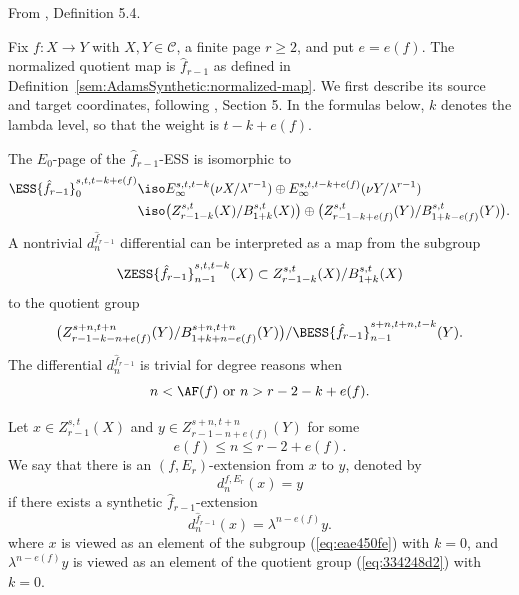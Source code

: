 \begin{definition}
\label{paper:5.4}
From \cite{LWX126}, Definition 5.4.\par

\label{def:6c076a33}
Fix $f:X\to Y$ with $X,Y\in\mathcal C$, a finite page $r\ge2$,
and put $e=e(f)$. The normalized quotient map is
$\widehat f_{r-1}$ as defined in
Definition~\ref{sem:AdamsSynthetic:normalized-map}.
We first describe its source and target coordinates, following
\cite{LWX126}, Section 5. In the formulas below, $k$ denotes the
lambda level, so that the weight is $t-k+e(f)$.

The $E_0$-page of the $\hat f_{r-1}$-ESS is isomorphic to
$$\begin{aligned}
    \ESS{\hat f_{r-1}}_0^{s,t,t-k+e(f)}\iso & E_\infty^{s,t,t-k}(\nu X/\lambda^{r-1})\oplus E_\infty^{s,t,t-k+e(f)}(\nu Y/\lambda^{r-1})\\
    \iso & \big(Z_{r-1-k}^{s,t}(X)/B_{1+k}^{s,t}(X)\big)\oplus \big(Z_{r-1-k+e(f)}^{s,t}(Y)/B_{1+k-e(f)}^{s,t}(Y)\big).
\end{aligned}$$
A nontrivial $d^{\hat f_{r-1}}_n$ differential can be interpreted as a map from the subgroup
\begin{equation}\label{eq:eae450fe}
  \ZESS{\hat f_{r-1}}_{n-1}^{s,t,t-k}(X) \subset  Z_{r-1-k}^{s,t}(X)/B_{1+k}^{s,t}(X)
\end{equation}
to the quotient group
\begin{equation}\label{eq:334248d2}
    \big(Z_{r-1-k-n+e(f)}^{s+n,t+n}(Y)/B_{1+k+n-e(f)}^{s+n,t+n}(Y) \big)/\BESS{\hat f_{r-1}}_{n-1}^{s+n,t+n,t-k}(Y).
\end{equation}
The differential $d^{\hat f_{r-1}}_n$ is trivial for degree reasons when
$$n<\AF(f)\text{ or }n>r-2-k+e(f).$$

    Let $x\in Z^{s,t}_{r-1}(X)$ and $y\in Z^{s+n,t+n}_{r-1-n+e(f)}(Y)$ for some
    $$e(f)\le n\le r-2+e(f).$$
    We say that there is an $(f,E_r)$-extension from $x$ to $y$, denoted by
    \begin{equation}\label{eq:b98be76a}
    d_{n}^{f,E_r}(x)=y
    \end{equation}
    if there exists a synthetic $\hat f_{r-1}$-extension
    \begin{equation}\label{eq:a020bad3}
        d_{n}^{\hat f_{r-1}}(x)=\lambda^{n-e(f)} y.
    \end{equation}
    where $x$ is viewed as an element of the subgroup (\ref{eq:eae450fe}) with $k=0$, and $\lambda^{n-e(f)} y$ is viewed as an element of the quotient group (\ref{eq:334248d2}) with $k=0$.


\end{definition}
